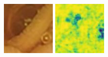 \documentclass[conference]{IEEEtran}
\begin{document}
\begin{figure}[!t]
    \endminipage\hfill
        \centering
        \includegraphics[width=\linewidth]{Figures/520/520_cycleGAN.jpg}
        
        \vfill
        \includegraphics[width=\linewidth]{Figures/520/520_cycleGAN_ssim.jpg}
        

\end{figure}
\end{document}
